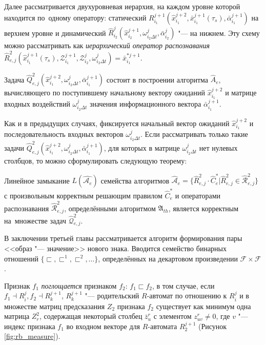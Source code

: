 Далее рассматривается двухуровневая иерархия, на каждом уровне которой находится по~одному оператору: статический $R_{i_1}^{j+1}(\hat x _{i_1}^{j+2},\bar x_{i_1}^{j+1}(\tau_s),\bar\alpha_{i_1}^{j+1})$ на верхнем уровне и динамический $\hat R_{i_2}^j(\hat x _{i_2}^{j+1},\omega_{i_2\Delta t}^j,\bar\alpha_{i_2}^j)$ "--- на нижнем. Эту схему можно рассматривать как \textit{иерархический оператор распознавания} $\hat R_{e,j}^2(\hat x_{i_1}^{j+1}(\tau_s),\mathcal Z_{i_1}^{j+1},\mathcal Z_{i_2}^j,\omega_{i_2\Delta t}^j)=\bar x_{i_1}^{*j+1}$.

Задача $\hat Q_{e,j}^2(\hat x_{i_1}^{j+2},\omega_{i_2\Delta t}^j,\bar\alpha_{i_1}^{j+1})$ состоит в построении алгоритма $\hat A_e$, вычисляющего по поступившему начальному вектору ожиданий $\hat x_{i_1}^{j+2}$ и матрице входных воздействий $\omega_{i_2\Delta t}^j$ значения информационного вектора $\bar\alpha_{i_1}^{j+1}$.

Как и в предыдущих случаях, фиксируется начальный вектор ожиданий $\hat x_{i_1}^{j+2}$ и последовательность входных векторов $\omega_{i_2\Delta{t}}^j$. Если рассматривать только такие задачи $\hat Q_{e,j}^2(\hat x_{i_1}^{j+2},\omega_{i_2\Delta{t}}^j,\bar\alpha_{i_1}^{j+1})$, для которых в матрице $\omega_{i_2\Delta{t}}^j$ нет нулевых столбцов, то можно сформулировать следующую теорему:

\begin{Theorem}\label{th:hier_correct}
	Линейное замыкание $L(\hat{\mathcal A_e})$ семейства алгоритмов $\hat{\mathcal A}_e=\{\hat R_{e,j}^2\cdot\hat C_e^*|\hat R_{e,j}^2\in\hat{\mathcal R}_{e,j}^2\}$ с произвольным корректным решающим правилом $\hat C_e^*$ и операторами распознавания $\hat{\mathcal R}_{e,j}^2$, определёнными алгоритмом $\mathfrak A_{th}$, является корректным на~множестве задач $\hat{\mathcal Q}_{e,j}^2$.
\end{Theorem}

В заключении третьей главы рассматривается алгоритм формирования пары <<образ "--- значение>> нового знака. Вводится семейство бинарных отношений $\{\sqsubset,\sqsubset^1,\sqsubset^2,\dots\}$, определённых на декартовом произведении $\mathcal F\times\mathcal F$. 

Признак $f_1$ \textit{поглощается} признаком $f_2$: $f_1\sqsubset f_2$, в том случае, если $f_1\dashv R_i^j, f_2\dashv R_k^{j+1}$, $R_k^{j+1}$ "--- родительский $R$-автомат по отношению к $R_i^j$ и в множестве матриц предсказания $Z_2$ признака $f_2$ существует как минимум одна матрица $Z_r^2$, содержащая некоторый столбец $\bar z_u^r$ с элементом $z_{uv}^r\not=0$, где $v$ "--- индекс признака $f_1$ во входном векторе для $R$-автомата $R_2^{j+1}$ (Рисунок \ref{fig:rb_measure}).

